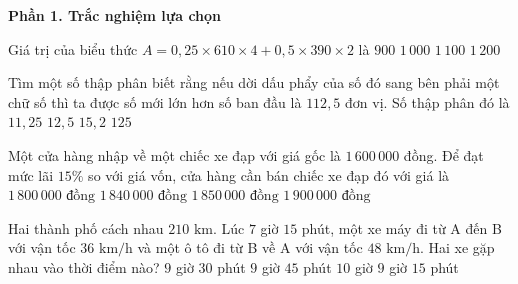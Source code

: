 \textbf{Phần 1. Trắc nghiệm lựa chọn}

\begin{ex} %
Giá trị của biểu thức $A = 0{,}25 \times 610 \times 4 + 0{,}5 \times 390 \times 2$ là
\choice
{$900$}
{\True $1\,000$}
{$1\,100$}
{$1\,200$}
\end{ex}

\begin{ex} %
Tìm một số thập phân biết rằng nếu dời dấu phẩy của số đó sang bên phải một chữ số thì ta được số mới lớn hơn số ban đầu là $112{,}5$ đơn vị. Số thập phân đó là
\choice
{$11{,}25$}
{\True $12{,}5$}
{$15{,}2$}
{$125$}
\end{ex}

\begin{ex} %
Một cửa hàng nhập về một chiếc xe đạp với giá gốc là $1\,600\,000$ đồng. Để đạt mức lãi $15\%$ so với giá vốn, cửa hàng cần bán chiếc xe đạp đó với giá là
\choice
{$1\,800\,000\text{ đồng}$}
{\True $1\,840\,000\text{ đồng}$}
{$1\,850\,000\text{ đồng}$}
{$1\,900\,000\text{ đồng}$}
\end{ex}

\begin{ex} %
Hai thành phố cách nhau $210\text{ km}$. Lúc $7$ giờ $15$ phút, một xe máy đi từ A đến B với vận tốc $36\text{ km/h}$ và một ô tô đi từ B về A với vận tốc $48\text{ km/h}$. Hai xe gặp nhau vào thời điểm nào?
\choice
{$9$ giờ $30$ phút}
{\True $9$ giờ $45$ phút}
{$10$ giờ}
{$9$ giờ $15$ phút}
\end{ex}

